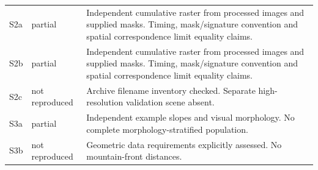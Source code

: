 \begin{longtable}{p{.12\linewidth}p{.16\linewidth}p{.64\linewidth}}
S2a & partial & Independent cumulative raster from processed images and supplied masks. Timing, mask/signature convention and spatial correspondence limit equality claims.\\
S2b & partial & Independent cumulative raster from processed images and supplied masks. Timing, mask/signature convention and spatial correspondence limit equality claims.\\
S2c & not reproduced & Archive filename inventory checked. Separate high-resolution validation scene absent.\\
S3a & partial & Independent example slopes and visual morphology. No complete morphology-stratified population.\\
S3b & not reproduced & Geometric data requirements explicitly assessed. No mountain-front distances.\\
\bottomrule\end{longtable}\normalsize
